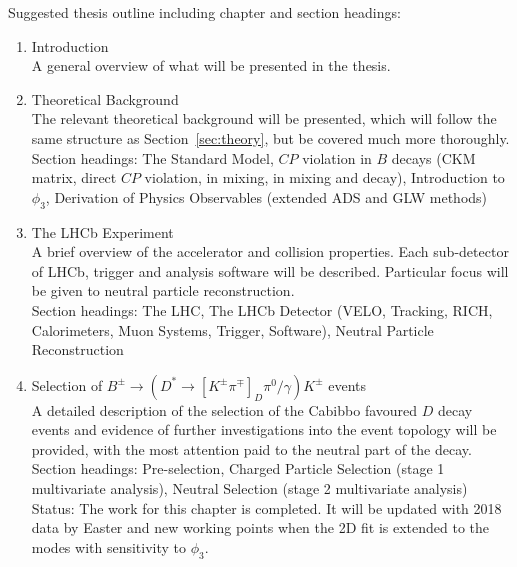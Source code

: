 \documentclass[oneside,12pt]{article}
\begin{document}
\noindent Suggested thesis outline including chapter and section headings:
\begin{enumerate}
\item Introduction \\

A general overview of what will be presented in the thesis. \\

\item Theoretical Background \\

The relevant theoretical background will be presented, which will follow the
same structure as Section~\ref{sec:theory}, but be covered much more
thoroughly. \\ 

Section headings: The Standard Model, $CP$ violation in $B$ decays
(CKM matrix, direct $CP$ violation, in mixing, in mixing and decay),
Introduction to $\phi_3$, Derivation of Physics Observables (extended ADS and
GLW methods)

\item The LHCb Experiment \\

A brief overview of the accelerator and collision properties. Each sub-detector
of LHCb, trigger and analysis software will be described.  Particular focus
will be given to neutral particle reconstruction. \\

Section headings: The LHC, The LHCb Detector (VELO, Tracking, RICH,
Calorimeters, Muon Systems, Trigger, Software), Neutral Particle Reconstruction 

\item Selection of $B^{\pm}\rightarrow (D^*\rightarrow
[K^{\pm}\pi^{\mp}]_D\pi^0/\gamma)K^{\pm}$ events \\
	
A detailed description of the selection of the Cabibbo favoured $D$ decay
events and evidence of further investigations into the event topology will be
provided, with the most attention paid to the neutral part of the decay. \\

Section headings: Pre-selection, Charged Particle Selection (stage 1
multivariate analysis), Neutral Selection (stage 2 multivariate analysis) \\

Status: The work for this chapter is completed. It will be updated with 2018
data by Easter and new working points when the 2D fit is extended to the modes with
sensitivity to $\phi_3$.


\end{enumerate}
\end{document}

